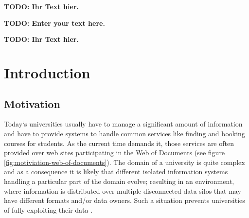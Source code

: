 \documentclass[draft,final]{vutinfth} %
\newcommand{\todo}[1]{{\color{red}\textbf{TODO: {#1}}}} %
\begin{document}
\frontmatter %

\addstatementpage

\begin{danksagung*}
\todo{Ihr Text hier.}
\end{danksagung*}

\begin{acknowledgements*}
\todo{Enter your text here.}
\end{acknowledgements*}

\begin{kurzfassung}
\todo{Ihr Text hier.}
\end{kurzfassung}

\begin{abstract}
\todo{Enter your text here.}
\end{abstract}


\tableofcontents %

\mainmatter

\chapter{Introduction}
\label{introduction-chapter}

\section{Motivation}
Today`s universities usually have to manage a significant amount of information and have to provide systems to handle common services like finding and booking courses for students. As the current time demands it, those services are often provided over web sites participating in the Web of Documents (see figure \ref{fig:motiviation-web-of-documents}). The domain of a university is quite complex and as a consequence it is likely that different isolated information systems handling a particular part of the domain evolve; resulting in an environment, where information is distributed over multiple disconnected data silos that may have different formats and/or data owners. Such a situation prevents universities of fully exploiting their data \cite{zablith_consuming_2011}. 
\end{document}
